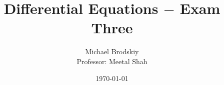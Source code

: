 \documentclass[12pt]{article}
\title{Differential Equations $-$ Exam Three}
\date{\today}
\author{Michael Brodskiy\\ \small Professor: Meetal Shah}
\begin{document}
\maketitle

\hline
\begin{equation}
  \begin{split}
  \end{split}
  \label{1}
\end{equation}
\hline

\begin{equation}
  \begin{split}
  \end{split}
  \label{2}
\end{equation}

\hline
\begin{equation}
  \begin{split}
  \end{split}
  \label{3}
\end{equation}

\hline
\begin{equation}
  \begin{split}
  \end{split}
  \label{4}
\end{equation}

\hline
\begin{equation}
  \begin{split}
  \end{split}
  \label{5}
\end{equation}
\hline

\begin{equation}
  \begin{split}
  \end{split}
  \label{6}
\end{equation}
\hline


\begin{equation}
  \begin{split}
  \end{split}
  \label{7}
\end{equation}
\hline

\begin{equation}
  \begin{split}
  \end{split}
  \label{8}
\end{equation}


\hline
\begin{equation}
  \begin{split}
  \end{split}
  \label{9}
\end{equation}

\hline
\begin{equation}
  \begin{split}
  \end{split}
  \label{10}
\end{equation}
\hline

\begin{equation}
  \begin{split}
  \end{split}
  \label{11}
\end{equation}
\hline
\end{document}
